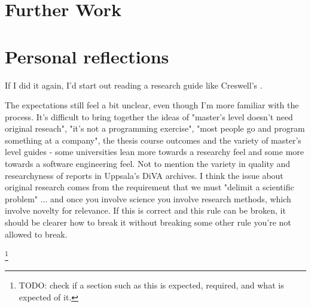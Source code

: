 \documentclass[a4paper]{report}
\newcommand{\todo}[1]{\footnote{{\color{red} TODO: #1}}}
\begin{document}
\section{Further Work}

\section{Personal reflections}

If I did it again, I'd start out reading a research guide like Creswell's \cite{creswell2003research}.

The expectations still feel a bit unclear, even though I'm more familiar with the process. It's difficult to bring together the ideas of "master's level doesn't need original reseach", "it's not a programming exercise", "most people go and program something at a company", the thesis course outcomes and the variety of master's level guides - some universities lean more towards a researchy feel and some more towards a software engineering feel. Not to mention the variety in quality and researchyness of reports in Uppsala's DiVA archives. I think the issue about original research comes from the requirement that we must "delimit a scientific problem" ... and once you involve science you involve research methods, which involve novelty for relevance. If this is correct and this rule can be broken, it should be clearer how to break it without breaking some other rule you're not allowed to break.

\todo{check if a section such as this is expected, required, and what is expected of it.}

\clearpage



\end{document}
